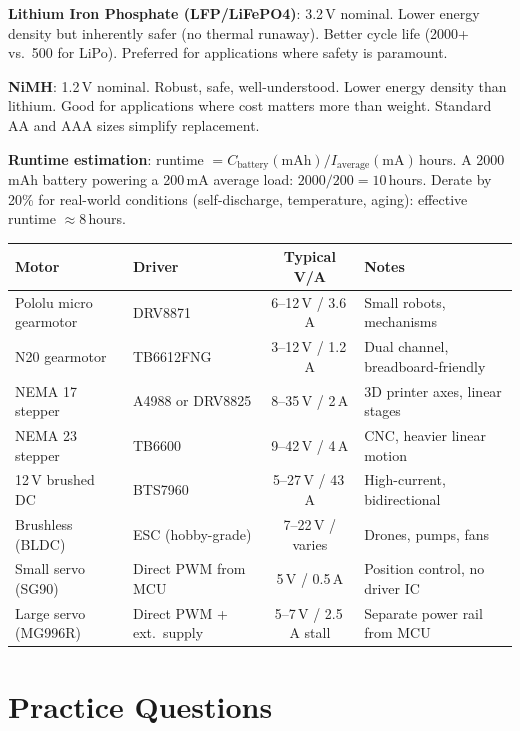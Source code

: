 \documentclass[11pt,letterpaper,twoside,openany]{book}
\begin{document}
\textbf{Lithium Iron Phosphate (LFP/LiFePO4)}: 3.2\,V nominal. Lower energy density but inherently safer (no thermal runaway). Better cycle life (2000+ vs.\ 500 for LiPo). Preferred for applications where safety is paramount.

\textbf{NiMH}: 1.2\,V nominal. Robust, safe, well-understood. Lower energy density than lithium. Good for applications where cost matters more than weight. Standard AA and AAA sizes simplify replacement.

\textbf{Runtime estimation}: runtime $= C_{\text{battery}}(\text{mAh}) / I_{\text{average}}(\text{mA})$\,hours. A 2000\,mAh battery powering a 200\,mA average load: $2000/200 = 10$\,hours. Derate by 20\% for real-world conditions (self-discharge, temperature, aging): effective runtime $\approx 8$\,hours.

\begin{quickrefbox}
\begin{table}[H]\centering\small
\begin{tabularx}{\textwidth}{l l c X}
\toprule
\textbf{Motor} & \textbf{Driver} & \textbf{Typical V/A} & \textbf{Notes} \\
\midrule
Pololu micro gearmotor & DRV8871 & 6--12\,V / 3.6\,A & Small robots, mechanisms \\
N20 gearmotor & TB6612FNG & 3--12\,V / 1.2\,A & Dual channel, breadboard-friendly \\
NEMA 17 stepper & A4988 or DRV8825 & 8--35\,V / 2\,A & 3D printer axes, linear stages \\
NEMA 23 stepper & TB6600 & 9--42\,V / 4\,A & CNC, heavier linear motion \\
12\,V brushed DC & BTS7960 & 5--27\,V / 43\,A & High-current, bidirectional \\
Brushless (BLDC) & ESC (hobby-grade) & 7--22\,V / varies & Drones, pumps, fans \\
Small servo (SG90) & Direct PWM from MCU & 5\,V / 0.5\,A & Position control, no driver IC \\
Large servo (MG996R) & Direct PWM + ext.\ supply & 5--7\,V / 2.5\,A stall & Separate power rail from MCU \\
\bottomrule
\end{tabularx}
\end{table}
\end{quickrefbox}

\section{Practice Questions}
\end{document}
